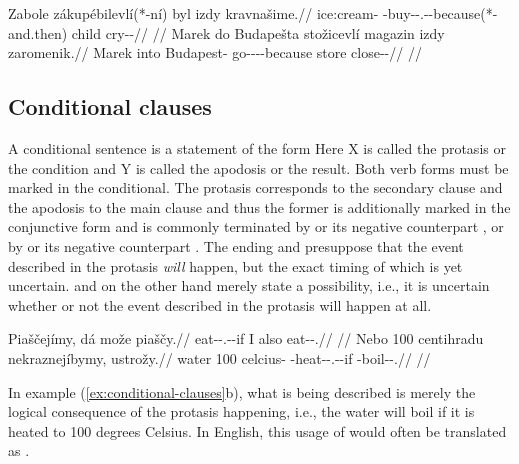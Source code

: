 \pex
\a\label{ex:causality-inference-uncertain}
\begingl
  \gla Zabole zákupébilevlí(*-ní) byl izdy kravnašime.//
  \glb ice:cream-\Acc{} \Neg{}-buy-\Ben{}-\Cond.\Pf{}-\Cnj{}-because(*-and.then) child \Spec{} cry-\Av{}-\Prog{}//
  \glft {}//
\endgl
\a
\begingl
  \gla Marek do Budapešta stožicevlí magazin izdy zaromenik.//
  \glb Marek into Budapest-\Acc{} go-\Av{}-\Pf{}-\Cnj{}-because store \Spec{} close-\Pv{}-\Pf{}//
  \glft {}//
\endgl
\xe

\subsection{Conditional clauses}
\label{sec:conditional-clauses}

A conditional sentence is a statement of the form  Here X is
called the protasis or the condition and Y is called the apodosis or the result.
Both verb forms must be marked in the conditional. The protasis corresponds to
the secondary clause and the apodosis to the main clause and thus the former is
additionally marked in the conjunctive form and is commonly terminated by
 or its negative counterpart , or by
 or its negative counterpart . The ending
 and  presuppose that the event described in the protasis
\emph{will} happen, but the exact timing of which is yet uncertain. 
and  on the other hand merely state a possibility, i.e., it is
uncertain whether or not the event described in the protasis will happen at all.

\pex\label{ex:conditional-clauses}
	\a
	\begingl
		\gla Piaščejímy, dá može piaščy.//
		\glb eat-\Av{}-\Cond{}.\Ipf{}-\Cnj{}-if I also eat-\Av{}-\Cond{}.\Ipf{}//
		\glft {}//
	\endgl
	\a
	\begingl
		\gla Nebo 100 centihradu nekraznejíbymy, ustrožy.//
		\glb water 100 celcius-\Ins{} \Caus{}-heat-\Pv{}-\Cond{}.\Ipf{}-\Cnj{}-if \Refl{}-boil-\Av{}-\Cond{}.\Ipf{}//
		\glft {}//
	\endgl
\xe

In example (\ref{ex:conditional-clauses}b), what is being described is merely
the logical consequence of the protasis happening, i.e., the water will boil if
it is heated to 100 degrees Celsius. In English, this usage of 
would often be translated as .

